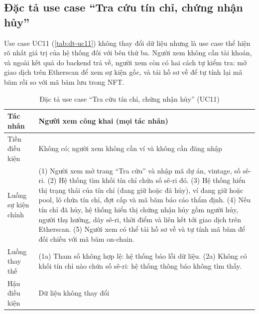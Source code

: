 \subsection*{Đặc tả use case ``Tra cứu tín chỉ, chứng nhận hủy''}
\label{subsec:dt-uc11}

Use case UC11 (\autoref{tab:dt-uc11}) không thay đổi dữ liệu nhưng là use case thể hiện rõ nhất giá trị của hệ thống đối với bên thứ ba. Người xem không cần tài khoản, và ngoài kết quả do backend trả về, người xem còn có hai cách tự kiểm tra: mở giao dịch trên Etherscan để xem sự kiện gốc, và tải hồ sơ về để tự tính lại mã băm rồi so với mã băm lưu trong NFT.

\begin{table}[!htbp]
    \centering
    \caption{Đặc tả use case ``Tra cứu tín chỉ, chứng nhận hủy'' (UC11)}
    \label{tab:dt-uc11}
    \small
    \begin{tabularx}{\textwidth}{|L{2.8cm}|Y|}
        \hline
        Tác nhân & Người xem công khai (mọi tác nhân) \\
        \hline
        Tiền điều kiện & Không có; người xem không cần ví và không cần đăng nhập \\
        \hline
        Luồng sự kiện chính & (1) Người xem mở trang ``Tra cứu'' và nhập mã dự án, vintage, số sê-ri.\newline
        (2) Hệ thống tìm khối tín chỉ chứa số sê-ri đó.\newline
        (3) Hệ thống hiển thị trạng thái của tín chỉ (đang giữ hoặc đã hủy), ví đang giữ hoặc pool, lô chứa tín chỉ, đợt cấp và mã băm báo cáo thẩm định.\newline
        (4) Nếu tín chỉ đã hủy, hệ thống hiển thị chứng nhận hủy gồm người hủy, người thụ hưởng, dãy sê-ri, thời điểm và liên kết tới giao dịch trên Etherscan.\newline
        (5) Người xem có thể tải hồ sơ về và tự tính mã băm để đối chiếu với mã băm on-chain. \\
        \hline
        Luồng thay thế & (1a) Tham số không hợp lệ: hệ thống báo lỗi dữ liệu.\newline
        (2a) Không có khối tín chỉ nào chứa số sê-ri: hệ thống thông báo không tìm thấy. \\
        \hline
        Hậu điều kiện & Dữ liệu không thay đổi \\
        \hline
    \end{tabularx}
\end{table}

\FloatBarrier
